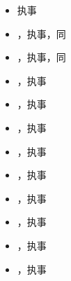 \begin{itemize}
\item 执事
\end{itemize}

\begin{itemize}
\item {}，执事，同
\end{itemize}

\begin{itemize}
\item {}，执事，同
\end{itemize}

\begin{itemize}
\item {}，执事
\end{itemize}

\begin{itemize}
\item {}，执事
\end{itemize}

\begin{itemize}
\item {}，执事
\end{itemize}

\begin{itemize}
\item {}，执事
\end{itemize}

\begin{itemize}
\item {}，执事
\end{itemize}

\begin{itemize}
\item {}，执事
\end{itemize}

\begin{itemize}
\item {}，执事
\end{itemize}

\begin{itemize}
\item {}，执事
\end{itemize}

\begin{itemize}
\item {}，执事
\end{itemize}


